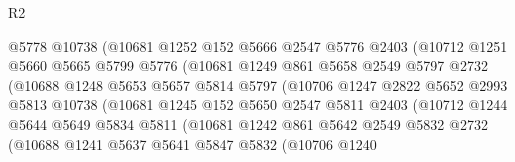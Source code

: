 \begin{lexlean}{R2}
\begin{coremodule}
                          @5778
                          @10738
                          (@10681
                            @1252
                            @152
                            @5666
                            @2547
                            @5776
                            @2403
                            (@10712
                              @1251
                              @5660
                              @5665
                              @5799
                              @5776
                              (@10681
                                @1249
                                @861
                                @5658
                                @2549
                                @5797
                                @2732
                                (@10688
                                  @1248
                                  @5653
                                  @5657
                                  @5814
                                  @5797
                                  (@10706
                                    @1247
                                    @2822
                                    @5652
                                    @2993
                                    @5813
                                    @10738
                                    (@10681
                                      @1245
                                      @152
                                      @5650
                                      @2547
                                      @5811
                                      @2403
                                      (@10712
                                        @1244
                                        @5644
                                        @5649
                                        @5834
                                        @5811
                                        (@10681
                                          @1242
                                          @861
                                          @5642
                                          @2549
                                          @5832
                                          @2732
                                          (@10688
                                            @1241
                                            @5637
                                            @5641
                                            @5847
                                            @5832
                                            (@10706
                                              @1240

\end{coremodule}
\end{lexlean}
